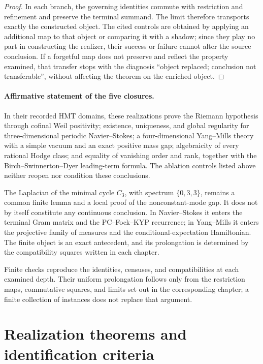\begin{proof}
In each branch, the governing identities commute with restriction and refinement and preserve the terminal summand. The limit therefore transports exactly the constructed object. The cited controls are obtained by applying an additional map to that object or comparing it with a shadow; since they play no part in constructing the realizer, their success or failure cannot alter the source conclusion. If a forgetful map does not preserve and reflect the property examined, that transfer stops with the diagnosis ``object replaced; conclusion not transferable'', without affecting the theorem on the enriched object.
\end{proof}

\paragraph{Affirmative statement of the five closures.}
In their recorded HMT domains, these realizations prove the Riemann hypothesis through cofinal Weil positivity; existence, uniqueness, and global regularity for three-dimensional periodic Navier--Stokes; a four-dimensional Yang--Mills theory with a simple vacuum and an exact positive mass gap; algebraicity of every rational Hodge class; and equality of vanishing order and rank, together with the Birch--Swinnerton--Dyer leading-term formula. The ablation controls listed above neither reopen nor condition these conclusions.

The Laplacian of the minimal cycle \(C_3\), with spectrum \(\{0,3,3\}\), remains a common finite lemma and a local proof of the nonconstant-mode gap. It does not by itself constitute any continuous conclusion. In Navier--Stokes it enters the terminal Gram matrix and the PC--Fock--KYP recurrence; in Yang--Mills it enters the projective family of measures and the conditional-expectation Hamiltonian. The finite object is an exact antecedent, and its prolongation is determined by the compatibility squares written in each chapter.

Finite checks reproduce the identities, censuses, and compatibilities at each examined depth. Their uniform prolongation follows only from the restriction maps, commutative squares, and limits set out in the corresponding chapter; a finite collection of instances does not replace that argument.

\section*{Realization theorems and identification criteria}

